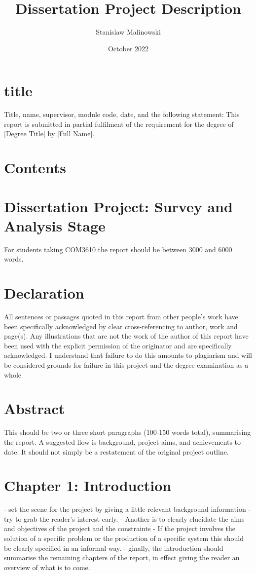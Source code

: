 \documentclass{article}
\title{Dissertation Project Description}
\author{Stanislaw Malinowski}
\date{October 2022}
\begin{document}
\maketitle
\section{title}
Title, name, supervisor, module code, date,
and the following statement: This report is submitted in partial fulfilment of the requirement for the degree of [Degree Title] by [Full Name].

\section*{Contents}
\tableofcontents
\newpage

\section{Dissertation Project: Survey and Analysis Stage}

For students taking COM3610 the report should be between 3000 and 6000 words.


\section{Declaration}

All sentences or passages quoted in this report from other people's work have been specifically acknowledged by clear cross-referencing to author, work and page(s). Any illustrations that are not the work of the author of this report have been used with the explicit permission of the originator and are specifically acknowledged. I understand that failure to do this amounts to plagiarism and will be considered grounds for failure in this project and the degree examination as a whole

\newpage


\section{Abstract}

This should be two or three short paragraphs (100-150 words total), summarising the report.
A suggested flow is background, project aims, and achievements to date. It should not simply be a restatement of the original project outline.

\section{Chapter 1: Introduction}
- set the scene for the project by giving a little relevant background information - try to grab the reader's interest early.
-  Another is to clearly elucidate the aims and objectives of the project and the constraints 
- If the project involves the solution of a specific problem or the production of a specific system this should be clearly specified in an informal way.
- ginally, the introduction should summarise the remaining chapters of the report, in effect giving the reader an overview of what is to come.
\end{document}
